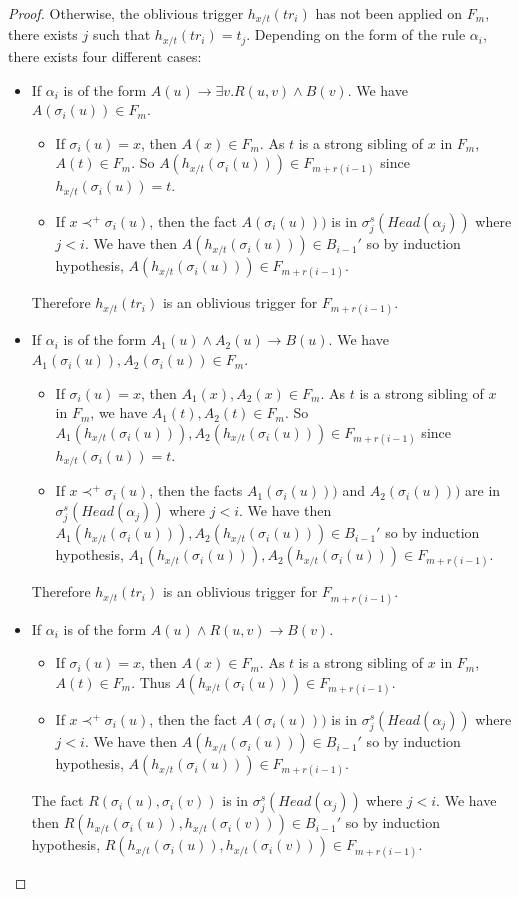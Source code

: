 \documentclass{article}
\theoremstyle{definition}
\theoremstyle{remark}
\begin{document}
\begin{proof}
Otherwise, the oblivious trigger $h_{x/t}(tr_{i})$ has not been applied on $F_{m}$, there exists $j$ such that $h_{x/t}(tr_{i}) = t_j$. Depending on the form of the rule $\alpha_i$, there exists four different cases:
	\begin{itemize}
	\item If $\alpha_i$ is of the form $A(u) \rightarrow \exists v.R(u,v) \wedge B(v)$. We have $A(\sigma_i(u)) \in F_m$.
		\begin{itemize}
		\item If $\sigma_i(u) = x$, then $A(x) \in F_m$. As $t$ is a strong sibling of $x$ in $F_m$, $A(t) \in F_m$. So $A(h_{x/t}(\sigma_i(u))) \in F_{m+r(i-1)}$ since $h_{x/t}(\sigma_i(u)) = t$.  
		\item If $x \prec^+ \sigma_i(u)$, then the fact $A(\sigma_i(u)))$ is in $\sigma_j^s(Head(\alpha_j))$ where $j<i$. We have then $A(h_{x/t}(\sigma_i(u)))\in B_{i-1}'$ so by induction hypothesis, $A(h_{x/t}(\sigma_i(u)))\in F_{m+r(i-1)}$. 
		\end{itemize}
Therefore $h_{x/t}(tr_{i})$ is an oblivious trigger for $F_{m+r(i-1)}$.

	\item If $\alpha_i$ is of the form $A_1(u) \wedge A_2(u) \rightarrow B(u)$. We have $A_1(\sigma_i(u)),A_2(\sigma_i(u)) \in F_m$.
		\begin{itemize}
		\item If $\sigma_i(u) = x$, then $A_1(x),A_2(x) \in F_m$. As $t$ is a strong sibling of $x$ in $F_m$, we have $A_1(t),A_2(t) \in F_m$. So $A_1(h_{x/t}(\sigma_i(u))),A_2(h_{x/t}(\sigma_i(u))) \in F_{m+r(i-1)}$ since $h_{x/t}(\sigma_i(u)) = t$.  
		\item If $x \prec^+ \sigma_i(u)$, then the facts $A_1(\sigma_i(u)))$ and $A_2(\sigma_i(u)))$ are in $\sigma_j^s(Head(\alpha_j))$ where $j<i$. We have then $A_1(h_{x/t}(\sigma_i(u))),A_2(h_{x/t}(\sigma_i(u)))\in B_{i-1}'$ so by induction hypothesis, $A_1(h_{x/t}(\sigma_i(u))),A_2(h_{x/t}(\sigma_i(u)))\in F_{m+r(i-1)}$. 
		\end{itemize}
Therefore $h_{x/t}(tr_{i})$ is an oblivious trigger for $F_{m+r(i-1)}$.  

\item If $\alpha_i$ is of the form $A(u) \wedge R(u,v) \rightarrow B(v)$.
	\begin{itemize}
		\item If $\sigma_i(u) = x$, then $A(x) \in F_m$. As $t$ is a strong sibling of $x$ in $F_m$, $A(t)\in F_m$. Thus $A(h_{x/t}(\sigma_i(u))) \in F_{m+r(i-1)}$.
		\item If $x \prec^+ \sigma_i(u)$, then the fact $A(\sigma_i(u)))$ is in $\sigma_j^s(Head(\alpha_j))$ where $j<i$. We have then $A(h_{x/t}(\sigma_i(u)))\in B_{i-1}'$ so by induction hypothesis, $A(h_{x/t}(\sigma_i(u)))\in F_{m+r(i-1)}$. 
		\end{itemize}
The fact $R(\sigma_i(u),\sigma_i(v))$ is in $\sigma_j^s(Head(\alpha_j))$ where $j<i$. We have then $R(h_{x/t}(\sigma_i(u)),h_{x/t}(\sigma_i(v)))\in B_{i-1}'$ so by induction hypothesis, $R(h_{x/t}(\sigma_i(u)),h_{x/t}(\sigma_i(v)))\in F_{m+r(i-1)}$. 		


\end{itemize}
\end{proof}
\end{document}
